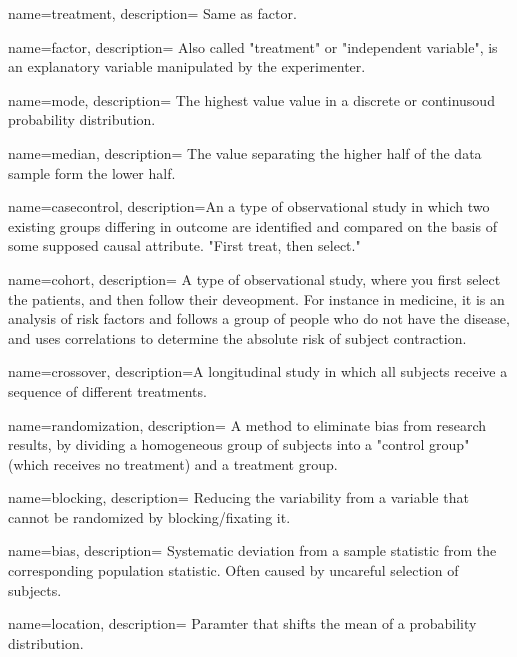 {
    name=treatment,
    description={ Same as factor.}
}

{
    name=factor,
    description={ Also called "treatment" or "independent variable", is an explanatory
    variable manipulated by the experimenter.}
}

{
    name=mode,
    description={ The highest value value in a discrete or continusoud
    probability distribution.}
}

{
    name=median,
    description={ The value separating the higher half of the data sample form the lower
    half.}
}

{
    name=casecontrol,
    description={An a type of observational study in which two existing groups differing in
    outcome are identified and compared on the basis of some supposed causal
    attribute. "First treat, then select."}
}

{
    name=cohort,
    description={ A type of observational study, where you first select the patients, and
    then follow their deveopment. For instance in medicine, it is an analysis
    of risk factors and follows a group of people who do not have the disease,
    and uses correlations to determine the absolute risk of subject
    contraction.}
}

{
    name=crossover,
    description={A longitudinal study in which all subjects receive a sequence of different
    treatments.}
}

{
    name=randomization,
    description={ A method to eliminate bias from research results, by dividing a
    homogeneous group of subjects into a "control group" (which receives no
    treatment) and a treatment group.}
}

{
    name=blocking,
    description={ Reducing the variability from a variable that cannot be randomized by
    blocking/fixating it.}
}

{
    name=bias,
    description={ Systematic deviation from a sample statistic from the corresponding
    population statistic. Often caused by uncareful selection of subjects.}
}

{
    name=location,
    description={ Paramter that shifts the mean of a probability
    distribution.}
}

